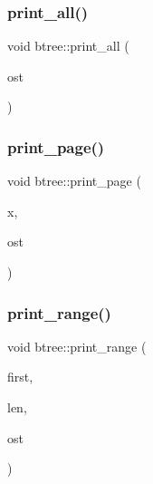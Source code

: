 \mbox{\label{classbtree_a34c238b9ff5f8dcdf31948c0abba05ca}} 
\subsubsection{\texorpdfstring{print\+\_\+all()}{print\_all()}}
{\footnotesize\ttfamily void btree\+::print\+\_\+all (\begin{DoxyParamCaption}\item[{ostream \&}]{ost }\end{DoxyParamCaption})}

\mbox{\label{classbtree_a844ce0c89c957a300e1e67223252440d}} 
\subsubsection{\texorpdfstring{print\+\_\+page()}{print\_page()}}
{\footnotesize\ttfamily void btree\+::print\+\_\+page (\begin{DoxyParamCaption}\item[{\mbox{\hyperlink{galois_8h_a09fddde158a3a20bd2dcadb609de11dc}{I\+NT}}}]{x,  }\item[{ostream \&}]{ost }\end{DoxyParamCaption})}

\mbox{\label{classbtree_afdde4b8008679f3c85b24b254a5ffdad}} 
\subsubsection{\texorpdfstring{print\+\_\+range()}{print\_range()}}
{\footnotesize\ttfamily void btree\+::print\+\_\+range (\begin{DoxyParamCaption}\item[{\mbox{\hyperlink{galois_8h_a09fddde158a3a20bd2dcadb609de11dc}{I\+NT}}}]{first,  }\item[{\mbox{\hyperlink{galois_8h_a09fddde158a3a20bd2dcadb609de11dc}{I\+NT}}}]{len,  }\item[{ostream \&}]{ost }\end{DoxyParamCaption})}


